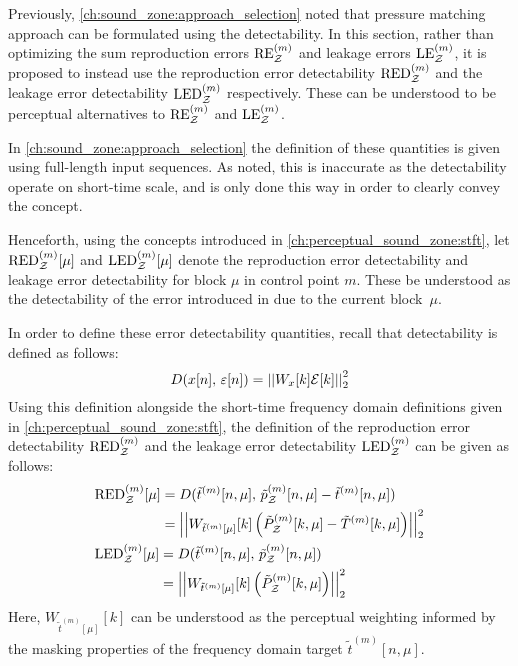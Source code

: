 Previously, \autoref{ch:sound_zone:approach_selection} noted that pressure matching approach can be formulated using the detectability.
In this section, rather than optimizing the sum reproduction errors $\text{RE}^{(m)}_{\mathcal{Z}}$ and leakage errors $\text{LE}^{(m)}_{\mathcal{Z}}$, it is proposed to instead use
the reproduction error detectability $\text{RED}^{(m)}_{\mathcal{Z}}$ and the leakage error detectability $\text{LED}^{(m)}_{\mathcal{Z}}$ respectively.
These can be understood to be perceptual alternatives to $\text{RE}^{(m)}_{\mathcal{Z}}$ and $\text{LE}^{(m)}_{\mathcal{Z}}$.

In \autoref{ch:sound_zone:approach_selection} the definition of these quantities is given using full-length input sequences.
As noted, this is inaccurate as the detectability operate on short-time scale, and is only done this way in order to clearly convey the concept. 

Henceforth, using the concepts introduced in \autoref{ch:perceptual_sound_zone:stft},
let $\text{RED}^{(m)}_{\mathcal{Z}}[\mu]$ and $\text{LED}^{(m)}_{\mathcal{Z}}[\mu]$ denote the reproduction error detectability and  
leakage error detectability for block $\mu$ in control point $m$. 
These be understood as the detectability of the error introduced in due to the current block~$\mu$.  

In order to define these error detectability quantities, recall that detectability is defined as follows: 
\begin{equation}
    D(x[n],\,\varepsilon[n]) = \norm[2][2]{W_x[k]\mathcal{E}[k]} 
\end{equation}
Using this definition alongside the short-time frequency domain definitions given in \autoref{ch:perceptual_sound_zone:stft}, 
the definition of the reproduction error detectability $\text{RED}^{(m)}_{\mathcal{Z}}$ 
and the leakage error detectability $\text{LED}^{(m)}_{\mathcal{Z}}$ can be given as follows:
\begin{align}
    &\begin{aligned}
        \text{RED}^{(m)}_\zz[\mu] &= D(\tilde{t}^{(m)}[n, \mu],\,\tilde{p}_\zz^{(m)}[n, \mu] - \tilde{t}^{(m)}[n, \mu]) \\
                       &= \norm[2][2]{W_{\tilde{t}^{(m)}[\mu]}[k]
                            \left(\tilde{P}_\zz^{(m)}[k, \mu] - \tilde{T}^{(m)}[k, \mu]\right)}
    \end{aligned}\\
    &\begin{aligned}
        \text{LED}^{(m)}_\zz[\mu] &= D(\tilde{t}^{(m)}[n, \mu],\,\tilde{p}_\zz^{(m)}[n, \mu]) \\
                       &= \norm[2][2]{W_{\tilde{t}^{(m)}[\mu]}[k]
                            \left(\tilde{P}_\zz^{(m)}[k, \mu]\right)}
    \end{aligned}
\end{align}
Here, $W_{\tilde{t}^{(m)}[\mu]}[k]$ can be understood as the perceptual weighting informed by the masking properties of the
frequency domain target $\tilde{t}^{(m)}[n, \mu]$.

